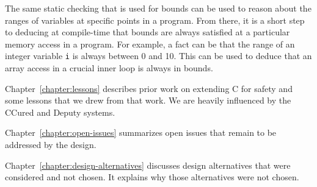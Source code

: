 The same static checking that is used for bounds can be used to reason
about the ranges of variables at specific points in a program. From
there, it is a short step to deducing at compile-time that bounds are
always satisfied at a particular memory access in a program. For
example, a fact can be that the range of an integer variable \texttt{i}
is always between 0 and 10. This can be used to deduce that an array
access in a crucial inner loop is always in bounds.


Chapter~\ref{chapter:lessons} describes prior work on extending C for safety and some
lessons that we drew from that work. We are heavily influenced by the
CCured and Deputy systems.


Chapter~\ref{chapter:open-issues} summarizes open issues that remain to be addressed
by the design.

Chapter~\ref{chapter:design-alternatives} discusses design alternatives
that were considered and not chosen.  It explains why those alternatives were
not chosen.

\